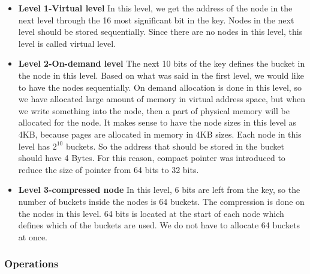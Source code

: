 \documentclass{report}
\begin{document}
\begin{itemize}
 
 \item \textbf{Level 1-Virtual level} In this level, we get the address of the node in the next level through the 16 most significant bit in the key. Nodes in the next level should be stored sequentially. Since there are no nodes in this level, this level is called virtual level.
 \item \textbf{Level 2-On-demand level} The next 10 bits of the key defines the bucket in the node in this level. Based on what was said in the first level, we would like to have the nodes sequentially. On demand allocation is done in this level, so we have allocated large amount of memory in virtual address space, but when we write something into the node, then a part of physical memory will be allocated for the node. It makes sense to have the node sizes in this level as 4KB, because pages are allocated in memory in 4KB sizes. Each node in this level has ${2}^{10}$ buckets. So the address that should be stored in the bucket should have 4 Bytes. For this reason, compact pointer was introduced to reduce the size of pointer from 64 bits to 32 bits.
  
 \item \textbf{Level 3-compressed node} In this level, 6 bits are left from the key, so the number of buckets inside the nodes is 64 buckets. The compression is done on the nodes in this level. 64 bits is located at the start of each node which defines which of the buckets are used. We do not have to allocate 64 buckets at once. 
 
\end{itemize}    

\subsubsection{Operations}
\end{document}
